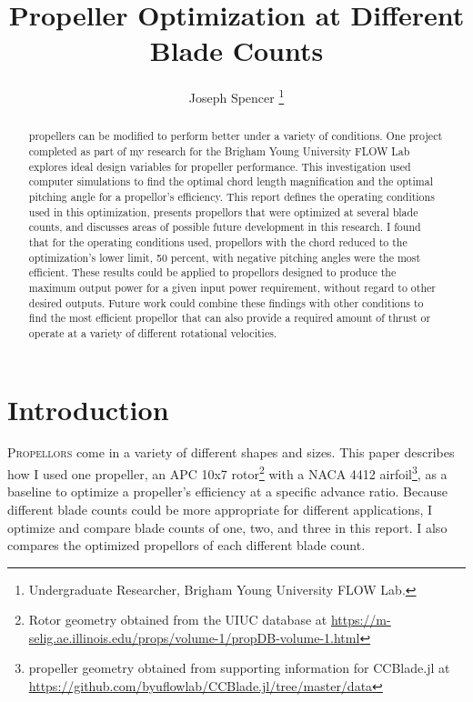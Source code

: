 \documentclass[journal ]{new-aiaa}
\title{Propeller Optimization at Different Blade Counts}
\author{Joseph Spencer \footnote{Undergraduate Researcher, Brigham Young University FLOW Lab.}}
\affil{Brigham Young University, Provo, Utah, 84601}
\begin{document}
\maketitle

\begin{abstract}

propellers can be modified to perform better under a variety of conditions. One project completed as part of my research for the Brigham Young University FLOW Lab explores ideal design variables for propeller performance. This investigation used computer simulations to find the optimal chord length magnification and the optimal pitching angle for a propellor's efficiency. This report defines the operating conditions used in this optimization, presents propellors that were optimized at several blade counts, and discusses areas of possible future development in this research. I found that for the operating conditions used, propellors with the chord reduced to the optimization's lower limit, 50 percent, with negative pitching angles were the most efficient. These results could be applied to propellors designed to produce the maximum output power for a given input power requirement, without regard to other desired outputs. Future work could combine these findings with other conditions to find the most efficient propellor that can also provide a required amount of thrust or operate at a variety of different rotational velocities.

\end{abstract}


\section{Introduction}

\lettrine{P}{ropellors} come in a variety of different shapes and sizes. This paper describes how I used one propeller, an APC 10x7 rotor\footnote{Rotor geometry obtained from the UIUC database at \url{https://m-selig.ae.illinois.edu/props/volume-1/propDB-volume-1.html}} with a NACA 4412 airfoil\footnote{propeller geometry obtained from supporting information for CCBlade.jl at \url{https://github.com/byuflowlab/CCBlade.jl/tree/master/data}}, as a baseline to optimize a propeller's efficiency at a specific advance ratio. Because different blade counts could be more appropriate for different applications, I optimize and compare blade counts of one, two, and three in this report. I also compares the optimized propellors of each different blade count.
\end{document}
